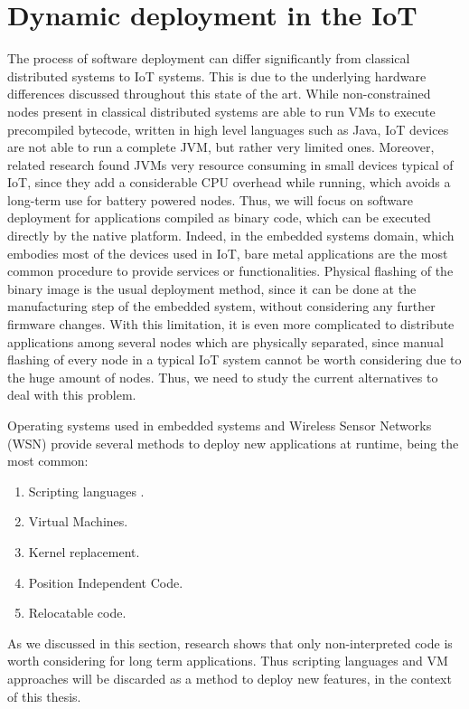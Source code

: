 \section{Dynamic deployment in the IoT}
\label{sec:IoTDeployment}
The process of software deployment can differ significantly from classical distributed systems to IoT systems.
This is due to the underlying hardware differences discussed throughout this state of the art.
While non-constrained nodes present in classical distributed systems are able to run VMs to execute precompiled bytecode, written in high level languages such as Java, IoT devices are not able to run a complete JVM, but rather very limited ones\cite{levis2002mate}\cite{brouwers2009darjeeling}.
Moreover, related research\cite{oliver2014reprogramming} found JVMs very resource consuming in small devices typical of IoT, since they add a considerable CPU overhead while running, which avoids a long-term use for battery powered nodes.
Thus, we will focus on software deployment for applications compiled as binary code, which can be executed directly by the native platform.
Indeed, in the embedded systems domain, which embodies most of the devices used in IoT, bare metal applications are the most common procedure to provide services or functionalities.
Physical flashing of the binary image is the usual deployment method, since it can be done at the manufacturing step of the embedded system, without considering any further firmware changes.
With this limitation, it is even more complicated to distribute applications among several nodes which are physically separated, since manual flashing of every node in a typical IoT system cannot be worth considering due to the huge amount of nodes.
Thus, we need to study the current alternatives to deal with this problem.

Operating systems used in embedded systems and Wireless Sensor Networks (WSN) provide several methods to deploy new applications at runtime, being the most common:
\begin{enumerate}
	\item Scripting languages \cite{dunkels2006low}\cite{kovatsch2012actinium}.
	\item Virtual Machines.
	\item Kernel replacement.
	\item Position Independent Code.
	\item Relocatable code.
\end{enumerate}
As we discussed in this section, research shows that only non-interpreted code is worth considering for long term applications.
Thus scripting languages and VM approaches will be discarded as a method to deploy new features, in the context of this thesis.

